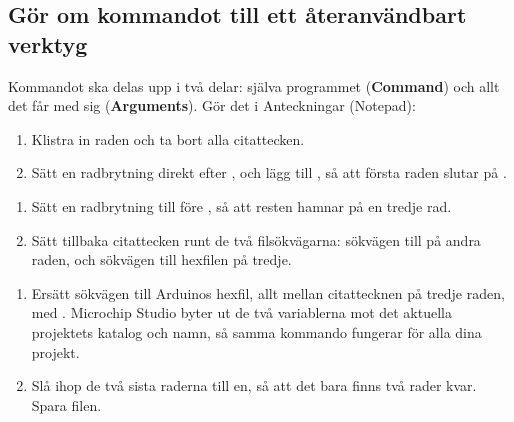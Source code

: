 
\subsection{Gör om kommandot till ett återanvändbart verktyg}
\label{studio:5-3}
Kommandot ska delas upp i två delar: själva programmet (\textbf{Command}) och allt det får med sig
(\textbf{Arguments}). Gör det i Anteckningar (Notepad):
\begin{enumerate}
  \item Klistra in raden och ta bort alla citattecken.
  \item Sätt en radbrytning direkt efter , och lägg till , så att
    första raden slutar på .
\end{enumerate}



\begin{enumerate}[start=3]
  \item Sätt en radbrytning till före , så att resten hamnar på en tredje rad.
  \item Sätt tillbaka citattecken runt de två filsökvägarna: sökvägen till  på
    andra raden, och sökvägen till hexfilen på tredje.
\end{enumerate}


\begin{enumerate}[start=5]
  \item Ersätt sökvägen till Arduinos hexfil, allt mellan citattecknen på tredje raden, med
    . Microchip Studio byter ut de två variablerna mot
    det aktuella projektets katalog och namn, så samma kommando fungerar för alla dina projekt.
  \item Slå ihop de två sista raderna till en, så att det bara finns två rader kvar. Spara filen.
\end{enumerate}

